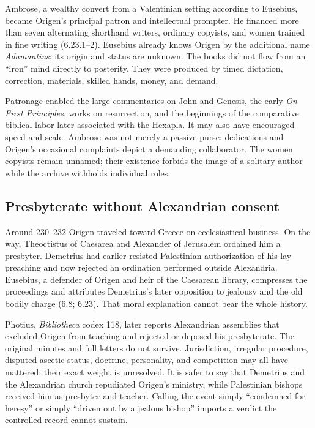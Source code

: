 Ambrose, a wealthy convert from a Valentinian setting according to Eusebius,
became Origen's principal patron and intellectual prompter. He financed more
than seven alternating shorthand writers, ordinary copyists, and women trained
in fine writing (6.23.1--2). Eusebius already knows Origen by the additional
name \emph{Adamantius}; its origin and status are unknown. The books did not
flow from an ``iron'' mind directly to posterity. They were produced by timed
dictation, correction, materials,
skilled hands, money, and demand.

Patronage enabled the large commentaries on John and Genesis, the early
\emph{On First Principles}, works on resurrection, and the beginnings of the
comparative biblical labor later associated with the Hexapla. It may also have
encouraged speed and scale. Ambrose was not merely a passive purse: dedications
and Origen's occasional complaints depict a demanding collaborator. The women
copyists remain unnamed; their existence forbids the image of a solitary
author while the archive withholds individual roles.

\subsection{Presbyterate without Alexandrian consent}

Around 230--232 Origen traveled toward Greece on ecclesiastical business. On
the way, Theoctistus of Caesarea and Alexander of Jerusalem ordained him a
presbyter. Demetrius had earlier resisted Palestinian authorization of his lay
preaching and now rejected an ordination performed outside Alexandria.
Eusebius, a defender of Origen and heir of the Caesarean library, compresses
the proceedings and attributes Demetrius's later opposition to jealousy and
the old bodily charge (6.8; 6.23). That moral explanation cannot bear the
whole history.

Photius, \emph{Bibliotheca} codex 118, later reports Alexandrian assemblies
that excluded Origen from teaching and rejected or deposed his presbyterate.
The original minutes and full letters do not survive. Jurisdiction, irregular
procedure, disputed
ascetic status, doctrine, personality, and competition may all have mattered;
their exact weight is unresolved. It is safer to say that Demetrius and the
Alexandrian church repudiated Origen's ministry, while Palestinian bishops
received him as presbyter and teacher. Calling the event simply ``condemned
for heresy'' or simply ``driven out by a jealous bishop'' imports a verdict the
controlled record cannot sustain.

